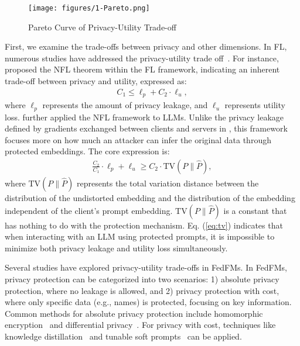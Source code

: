 \begin{figure}[htbp]
    \centering
    \texttt{[image: figures/1-Pareto.png]}
    \captionsetup{justification=centering}
    \caption{Pareto Curve of Privacy-Utility Trade-off}
    \label{fig:Pareto}
\end{figure}

First, we examine the trade-offs between privacy and other dimensions. In  FL, numerous studies have addressed the privacy-utility trade off~\cite{zhang2022no, kang2023optimizing}. For instance, \citet{zhang2022no} proposed the NFL theorem within the FL framework, indicating an inherent trade-off between privacy and utility, expressed as:
\begin{align}
C_1 \leq \ell_p + C_2\cdot\ell_u,
\end{align}
where $\ell_p $ represents the amount of privacy leakage, and $\ell_u$ represents utility loss. \citet{zhang2024no} further applied the NFL framework to LLMs. Unlike the privacy leakage defined by gradients exchanged between clients and servers in \cite{zhang2022no}, this framework focuses more on how much an attacker can infer the original data through protected embeddings. The core expression is:
\begin{align}
\label{eq:tv}
\frac{C_2}{C_1} \cdot \ell_p + \ell_u \geq C_2 \cdot \text{TV}(P \parallel \hat{P}),
\end{align}
where $\text{TV}(P \parallel \hat{P})$ represents the total variation distance between the distribution of the undistorted embedding and the distribution of the embedding independent of the client's prompt embedding. $\text{TV}(P \parallel \hat{P})$ is a constant that has nothing to do with the protection mechanism. Eq. (\ref{eq:tv}) indicates that when interacting with an LLM using protected prompts, it is impossible to minimize both privacy leakage and utility loss simultaneously.

Several studies have explored privacy-utility trade-offs in FedFMs. In FedFMs, privacy protection can be categorized into two scenarios: 1) absolute privacy protection, where no leakage is allowed, and 2) privacy protection with cost, where only specific data (e.g., names) is protected, focusing on key information. Common methods for absolute privacy protection include homomorphic encryption~\cite{zheng2024safely} and differential privacy~\cite{ hou2023privately}. For privacy with cost, techniques like knowledge distillation~\cite{wang2023can} and tunable soft prompts~\cite{dong2023tunable} can be applied. 


